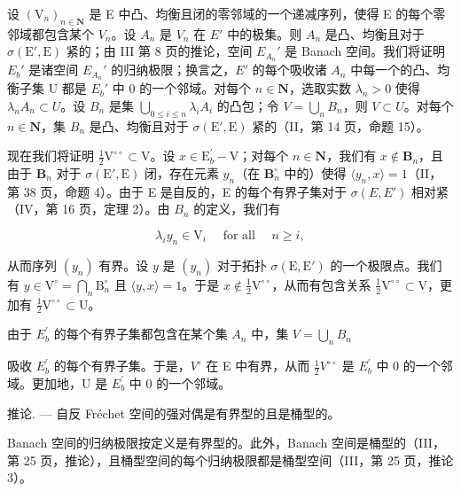 设 \((\mathrm{V}_{n})_{n\in\mathbf{N}}\) 是 E 中凸、均衡且闭的零邻域的一个递减序列，使得 E 的每个零邻域都包含某个 \(V_{n}\)。设 \(A_{n}\) 是 \(V_{n}\) 在 \(E'\) 中的极集。则 \(A_{n}\) 是凸、均衡且对于 \(\sigma(\mathrm{E}',\mathrm{E})\) 紧的；由 III 第 8 页的推论，空间 \(E_{A_{n}}'\) 是 Banach 空间。我们将证明 \(E_{b}'\) 是诸空间 \(E_{A_{n}}'\) 的归纳极限；换言之，\(E'\) 的每个吸收诸 \(A_{n}\) 中每一个的凸、均衡子集 U 都是 \(E_{b}'\) 中 0 的一个邻域。对每个 \(n\in\mathbf{N}\)，选取实数 \(\lambda_{n}>0\) 使得 \(\lambda_{n}A_{n}\subset U\)。设 \(B_{n}\) 是集 \(\bigcup_{0\leqslant i\leqslant n}\lambda_{i}A_{i}\) 的凸包；令 \(V=\bigcup_{n}B_{n}\)，则 \(V\subset U\)。对每个 \(n\in\mathbf{N}\)，集 \(B_{n}\) 是凸、均衡且对于 \(\sigma(\mathrm{E}',\mathrm{E})\) 紧的（II，第 14 页，命题 15）。

现在我们将证明 \(\frac{1}{2}\mathrm{V}^{\circ \circ}\subset \mathrm{V}\)。设 \(x\in \mathrm{E}_b^\prime -\mathrm{V}\)；对每个 \(n\in \mathbf{N}\)，我们有 \(x\notin \mathbf{B}_n\)，且由于 \(\mathbf{B}_n\) 对于 \(\sigma (\mathrm{E}',\mathrm{E})\) 闭，存在元素 \(y_{n}\)（在 \(\mathbf{B}_n^\circ\) 中的）使得 \(\langle y_n, x \rangle = 1\)（II，第 38 页，命题 4）。由于 E 是自反的，E 的每个有界子集对于 \(\sigma(E, E')\) 相对紧（IV，第 16 页，定理 2）。由 \(B_n\) 的定义，我们有

\[
\lambda_ {i} y _ {n} \in \mathrm{V} _ {i} \quad \text { for   all } \quad n \geqslant i  ,\tag{3}
\]

从而序列 \((y_{n})\) 有界。设 \(y\) 是 \((y_{n})\) 对于拓扑 \(\sigma(\mathrm{E},\mathrm{E}')\) 的一个极限点。我们有 \(y\in\mathrm{V}^{\circ}=\bigcap_{n}\mathrm{B}_{n}^{\circ}\) 且 \(\langle y,x\rangle=1\)。于是 \(x\notin\frac{1}{2}\mathrm{V}^{\circ\circ}\)，从而有包含关系 \(\frac{1}{2}\mathrm{V}^{\circ\circ}\subset\mathrm{V}\)，更加有 \(\frac{1}{2}\mathrm{V}^{\circ\circ}\subset\mathrm{U}\)。

由于 \(E_{b}^{\prime}\) 的每个有界子集都包含在某个集 \(A_{n}\) 中，集 \(V = \bigcup_{n} B_{n}\)

吸收 \(E_{b}^{\prime}\) 的每个有界子集。于是，\(V^{\circ}\) 在 E 中有界，从而 \(\frac{1}{2}V^{\circ\circ}\) 是 \(E_{b}^{\prime}\) 中 0 的一个邻域。更加地，U 是 \(E_{b}^{\prime}\) 中 0 的一个邻域。

推论. --- 自反 Fréchet 空间的强对偶是有界型的且是桶型的。

Banach 空间的归纳极限按定义是有界型的。此外，Banach 空间是桶型的（III，第 25 页，推论），且桶型空间的每个归纳极限都是桶型空间（III，第 25 页，推论 3）。

